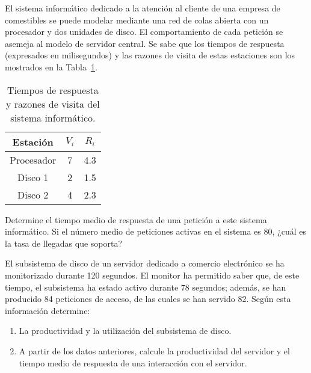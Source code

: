 \begin{ejercicio}\label{ej:5.5}
    El sistema informático dedicado a la atención al cliente de una empresa de comestibles se puede modelar mediante una red de colas abierta con un procesador y dos unidades de disco. El comportamiento de cada petición se asemeja al modelo de servidor central. Se sabe que los tiempos de respuesta (expresados en milisegundos) y las razones de visita de estas estaciones son los mostrados en la Tabla~\ref{tab:5.5}.
    \begin{table}[h]
        \centering
        \begin{tabular}{|c|c|c|}
            \hline
            Estación & $V_i$ & $R_i$ \\
            \hline
            Procesador & 7 & 4.3 \\
            Disco 1 & 2 & 1.5 \\
            Disco 2 & 4 & 2.3 \\
            \hline
        \end{tabular}
        \caption{Tiempos de respuesta y razones de visita del sistema informático.}
        \label{tab:5.5}
    \end{table}
    Determine el tiempo medio de respuesta de una petición a este sistema informático. Si el número medio de peticiones activas en el sistema es 80, ¿cuál es la tasa de llegadas que soporta?
\end{ejercicio}
\begin{comment}
\solucion
    El tiempo de respuesta del sistema es $42.3$ ms y la tasa de llegadas es $1.89$ peticiones/ms.
\end{comment}

\begin{ejercicio}\label{ej:5.6}
    El subsistema de disco de un servidor dedicado a comercio electrónico se ha monitorizado durante 120 segundos. El monitor ha permitido saber que, de este tiempo, el subsistema ha estado activo durante 78 segundos; además, se han producido 84 peticiones de acceso, de las cuales se han servido 82. Según esta información determine:
    \begin{enumerate}
        \item La productividad y la utilización del subsistema de disco.
        \item A partir de los datos anteriores, calcule la productividad del servidor y el tiempo medio de respuesta de una interacción con el servidor.
    \end{enumerate}
\end{ejercicio}
\begin{comment}
\solucion
    \begin{enumerate}
        \item Respecto del subsistema de disco: el error es del $2.4\%$, la productividad es $0.68$ peticiones/segundo y la utilización $0.65$.
        \item Respecto del servidor: la productividad es $0.137$ peticiones/segundo y el tiempo medio de respuesta $95.1$ segundos.
    \end{enumerate}
\end{comment}

